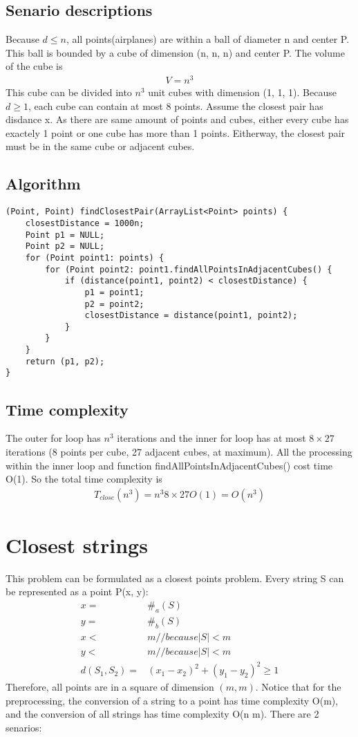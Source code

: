 \documentclass{article}
\begin{document}
\subsection{Senario descriptions}
Because $d \leq n$, all points(airplanes) are within a ball of diameter n and
center P. This ball is bounded by a cube of dimension (n, n, n) and center P.
The volume of the cube is
\begin{align*}
V = n^3
\end{align*}
This cube can be divided into $n^3$ unit cubes with dimension (1, 1, 1). Because
$d \geq 1$, each cube can contain at most 8 points. Assume the closest pair has
disdance x. As there are same amount of points and cubes, either every cube has
exactely 1 point or one cube has more than 1 points. Eitherway, the closest
pair must be in the same cube or adjacent cubes.
\subsection{Algorithm}
\begin{lstlisting}
(Point, Point) findClosestPair(ArrayList<Point> points) {
	closestDistance = 1000n;
	Point p1 = NULL;
	Point p2 = NULL;
	for (Point point1: points) {
		for (Point point2: point1.findAllPointsInAdjacentCubes() {
			if (distance(point1, point2) < closestDistance) {
				p1 = point1;
				p2 = point2;
				closestDistance = distance(point1, point2);
			}
		}
	}
	return (p1, p2);
}
\end{lstlisting}
\subsection{Time complexity}
The outer for loop has $n^3$ iterations and the inner for loop has at most $8
\times 27$ iterations (8 points per cube, 27 adjacent cubes, at maximum).
All the processing within the inner loop and function
findAllPointsInAdjacentCubes() cost time O(1). So the total time complexity is
\begin{align*}
T_{close}(n^3) = n^3 8 \times 27 O(1) = O(n^3)
\end{align*}
\section{Closest strings}
This problem can be formulated as a closest points problem. Every string S can
be represented as a point P(x, y):
\begin{align*}
x =& \#_a(S)\\
y =& \#_b(S)\\
x <& m // because \vert S \vert < m \\
y <& m // because \vert S \vert < m \\
d(S_1, S_2) =& (x_1-x_2)^2 + (y_1-y_2)^2 \geq 1
\end{align*}
Therefore, all points are in a square of dimension $(m, m)$. Notice that for the
preprocessing, the conversion of a string to a point has time complexity
O(m), and the conversion of all strings has time complexity O(n m). There are 2
senarios:
\end{document}
